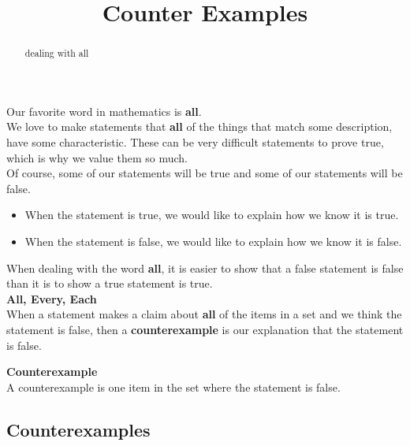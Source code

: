 \documentclass{ximera}
\title{Counter Examples}
\begin{document}
\begin{abstract}
dealing with all
\end{abstract}
\maketitle




Our favorite word in mathematics is \textbf{\textcolor{blue!55!black}{all}}. \\


We love to make statements that \textbf{all} of the things that match some description, have some characteristic. These can be very difficult statements to prove true, which is why we value them so much. \\


Of course, some of our statements will be true and some of our statements will be false.

\begin{itemize}
\item When the statement is true, we would like to explain how we know it is true.
\item When the statement is false, we would like to explain how we know it is false.
\end{itemize}



When dealing with the word \textbf{all}, it is easier to show that a false statement is false than it is to show a true statement is true. \\


\textbf{\textcolor{blue!55!black}{All, Every, Each}} \\

When a statement makes a claim about \textbf{\textcolor{red!80!black}{all}} of the items in a set and we think the statement is false, then a \textbf{counterexample} is our explanation that the statement is false.



\begin{definition}  \textbf{\textcolor{green!50!black}{Counterexample}} \\


A counterexample is one item in the set where the statement is false.


\end{definition}




\subsection*{Counterexamples}
\end{document}
